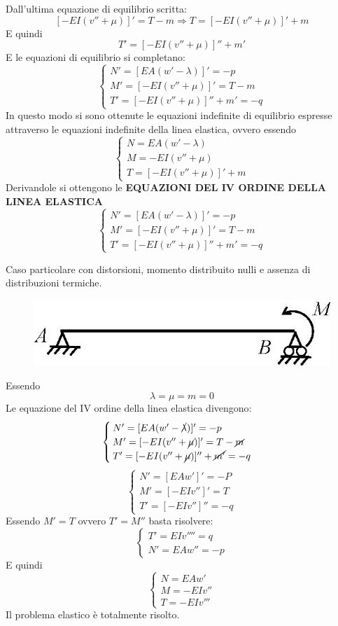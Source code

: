 \documentclass{article}
\begin{document}
\begin{adjustwidth}{2in}{}
		Dall'ultima equazione di equilibrio scritta:
		\[ [-EI(v'' +\mu)]'= T - m \Rightarrow T = [-EI(v'' +\mu)]' + m \]
		E quindi 
		\[T' = [-EI(v'' +\mu)]'' + m'\]
		E le equazioni di equilibrio si completano:
		\[
		\begin{cases}
			N'= [EA(w'-\lambda)]'= -p \\
			M'= [-EI(v'' +\mu)]'= T - m \\
			T' = [-EI(v'' +\mu)]'' + m' = -q
		\end{cases}
		\]
		In questo modo si sono ottenute le equazioni indefinite di equilibrio espresse attraverso le equazioni indefinite della linea elastica, ovvero essendo 
		\[\begin{cases}
		N = EA(w'-\lambda) \\
		M = -EI(v'' +\mu) \\
		T = [-EI(v'' +\mu)]' + m
		\end{cases}\]
		Derivandole si ottengono le\textbf{ EQUAZIONI DEL IV ORDINE DELLA LINEA ELASTICA}
		\[
		\begin{cases}
			N'= [EA(w'-\lambda)]'= -p \\
			M'= [-EI(v'' +\mu)]'= T - m \\
			T' = [-EI(v'' +\mu)]'' + m' = -q
		\end{cases}
		\]
	
		
		
		Caso particolare con distorsioni, momento distribuito nulli e assenza di distribuzioni termiche. 
		
\begin{figure}[H]
	\centering
	\includegraphics[width=0.4\linewidth]{"immagini/1.PARTE8_Pagina_35"}
\end{figure}
		Essendo
		\[ \lambda = \mu = m = 0 \]
		Le equazione del IV ordine della linea elastica divengono:
		\[
		\begin{cases}
			N'= [EA(w'-\cancel{\lambda})]'= -p \\
			M'= [-EI(v'' +\cancel{\mu})]'= T - \cancel{m} \\
			T' = [-EI(v'' +\cancel{\mu})]'' + \cancel{m'} = -q
		\end{cases}
		\]
		\[
		\begin{cases}
			N'= [EAw']'= -P \\
			M'= [-EIv'']'= T  \\
			T' = [-EIv'']'' = -q
		\end{cases}
		\]
		Essendo $ M'=T $ ovvero $ T'= M'' $ basta risolvere:
		\[
		\begin{cases}
				T' = EIv'''' = q \\
				N' = EAw'' = -p
		\end{cases} \]
		E quindi
		 \[ \begin{cases}
				N = EAw'\\
				M = -EIv'' \\
				T = -EIv'''
			\end{cases}
		\]
		Il problema elastico è totalmente risolto. \newline 
		

\end{adjustwidth}
\end{document}
